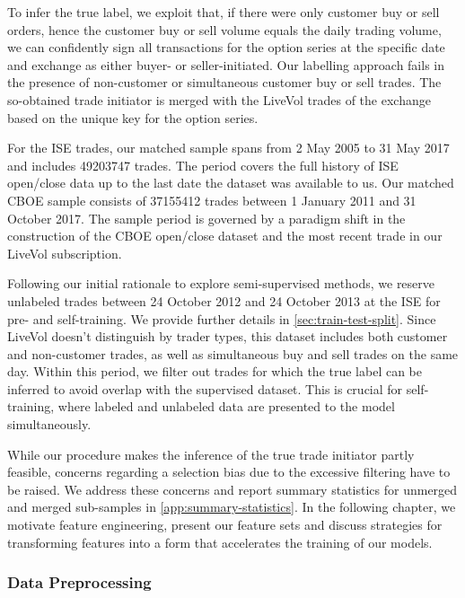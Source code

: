 To infer the true label, we exploit that, if there were only customer buy or sell orders, hence the customer buy or sell volume equals the daily trading volume, we can confidently sign all transactions for the option series at the specific date and exchange as either buyer- or seller-initiated. Our labelling approach fails in the presence of non-customer or simultaneous customer buy or sell trades. The so-obtained trade initiator is merged with the LiveVol trades of the exchange based on the unique key for the option series.

For the \gls{ISE} trades, our matched sample spans from 2 May 2005 to 31 May 2017 and includes \num{49203747} trades. The period covers the full history of \gls{ISE} open/close data up to the last date the dataset was available to us. Our matched \gls{CBOE} sample consists of \num{37155412} trades between 1 January 2011 and 31 October 2017. The sample period is governed by a paradigm shift in the construction of the \gls{CBOE} open/close dataset and the most recent trade in our LiveVol subscription.

Following our initial rationale to explore semi-supervised methods, we reserve unlabeled trades between 24 October 2012 and 24 October 2013 at the \gls{ISE} for pre- and self-training. We provide further details in \cref{sec:train-test-split}. Since LiveVol doesn't distinguish by trader types, this dataset includes both customer and non-customer trades, as well as simultaneous buy and sell trades on the same day. Within this period, we filter out trades for which the true label can be inferred to avoid overlap with the supervised dataset. This is crucial for self-training, where labeled and unlabeled data are presented to the model simultaneously.

While our procedure makes the inference of the true trade initiator partly feasible, concerns regarding a selection bias due to the excessive filtering have to be raised. We address these concerns and report summary statistics for unmerged and merged sub-samples in \cref{app:summary-statistics}. In the following chapter, we motivate feature engineering, present our feature sets and discuss strategies for transforming features into a form that accelerates the training of our models.

\subsubsection{Data Preprocessing}\label{sec:data-preprocessing}

